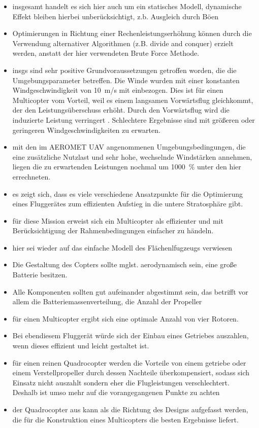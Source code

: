 \begin{itemize}
	\item insgesamt handelt es sich hier auch um ein statisches Modell, dynamische Effekt bleiben hierbei unberücksichtigt, z.b. Ausgleich durch Böen
	\item Optimierungen in Richtung einer Rechenleistungserhöhung können durch die Verwendung alternativer Algorithmen (z.B. divide and conquer) erzielt werden, anstatt der hier verwendeten Brute Force Methode.
	\item insgs sind sehr positive Grundvoraussetzungen getroffen worden, die die Umgebungsparameter betreffen. Die Winde wurden mit einer konstanten Windgeschwindigkeit von \SI{10}{m/s} mit einbezogen. Dies ist für einen Multicopter vom Vorteil, weil es einem langsamen Vorwärtsflug gleichkommt, der den Leistungsüberschuss erhöht. Durch den Vorwärtsflug wird die induzierte Leistung verringert \cite[S.329]{Wall.2015}. Schlechtere Ergebnisse sind mit größeren oder geringeren Windgeschwindigkeiten zu erwarten.
	\item mit den im AEROMET UAV angenommenen Umgebungsbedingungen, die eine zusätzliche Nutzlast und sehr hohe, wechselnde Windstärken annehmen, liegen die zu erwartenden Leistungen nochmal um \SI{1000}{\%} unter den hier errechneten. 
	
	\item es zeigt sich, dass es viele verschiedene Ansatzpunkte für die Optimierung eines Fluggerätes zum effizienten Aufstieg in die untere Stratosphäre gibt. 
	\item für diese Mission erweist sich ein Multicopter als effizienter und mit Berücksichtigung der Rahmenbedingungen einfacher zu händeln. 
	\item hier sei wieder auf das einfache Modell des Flächenlfugzeugs verwiesen
	\item Die Gestaltung des Copters sollte mglst. aerodynamisch sein, eine große Batterie besitzen.
	\item Alle Komponenten sollten gut aufeinander abgestimmt sein, das betrifft vor allem die Batteriemassenverteilung, die Anzahl der Propeller
	\item für einen Multicopter ergibt sich eine optimale Anzahl von vier Rotoren.
	\item Bei ebendiesem Fluggerät würde sich der Einbau eines Getriebes auszahlen, wenn dieses effizient und leicht gestaltet ist.
	\item für einen reinen Quadrocopter werden die Vorteile von einem getriebe oder einem Verstellpropeller durch dessen Nachteile überkompensiert, sodass sich Einsatz nicht auszahlt sondern eher die Flugleistungen verschlechtert. Deshalb ist umso mehr auf die vorangegangenen Punkte zu achten
	\item der Quadrocopter aus \cite{Anderson.2018} kann als die Richtung des Designs aufgefasst werden, die für die Konstruktion eines Multicopters die besten Ergebnisse liefert.
\end{itemize}


